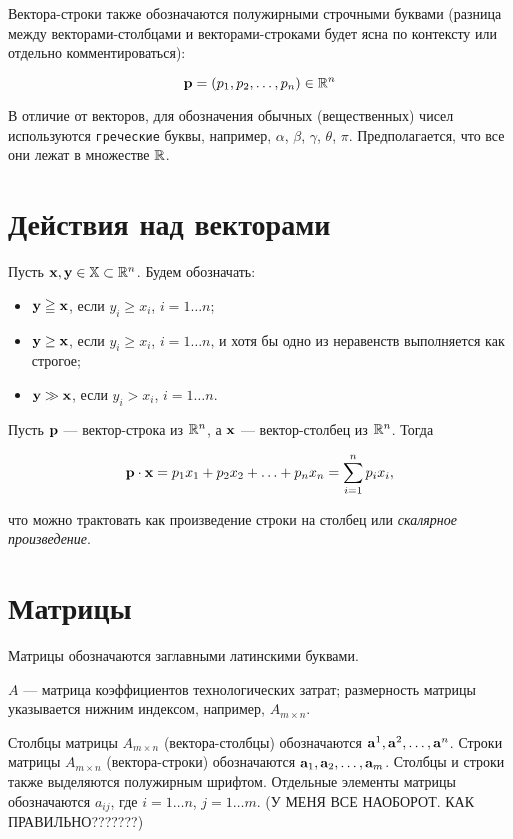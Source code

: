 \noindent Вектора-строки также обозначаются полужирными строчными
буквами (разница между векторами-столбцами и векторами-строками
будет ясна по контексту или отдельно комментироваться):

\[
\mathbf{p} = (p_1 ,p_2 , \ldots ,p_n ) \in \mathbb{R}^n
\]

В отличие от векторов, для обозначения обычных (вещественных) чисел
используются \texttt{греческие} буквы, например, $\alpha$, $\beta$,
$\gamma$, $\theta$, $\pi$. Предполагается, что все они лежат в
множестве $\mathbb{R}$.


\section*{Действия над векторами}

Пусть $\mathbf{x},\mathbf{y} \in \mathbb{X} \subset \mathbb{R}^n$. Будем обозначать:

\begin{itemize}
  \item $\mathbf{y} \geqq \mathbf{x}$, если $y_i \geq x_i$, $i=1 \ldots n$;
  \item $\mathbf{y} \geq \mathbf{x}$, если $y_i \geq x_i$, $i=1 \ldots n$, и хотя бы одно из
неравенств вы\-полняется как строгое;
  \item $\mathbf{y} \gg \mathbf{x}$, если $y_i > x_i$, $i=1 \ldots n$.
\end{itemize}

Пусть $\mathbf{p}$ --- вектор-строка из $\mathbb{R}^n$, а $\mathbf{x}$ ---
вектор-столбец из $\mathbb{R}^n$. Тогда

\[
\mathbf{p} \cdot \mathbf{x} = p_1 x_1 + p_2 x_2 + \ldots + p_n x_n = \sum
\limits_{i=1}^n p_i x_i,
\]

\noindent что можно трактовать как произведение строки на столбец
или \emph{скалярное произведение}.


\section*{Матрицы}

Матрицы обозначаются заглавными латинскими буквами.

$A$ --- матрица коэффициентов технологических затрат; размерность
матрицы указывается нижним индексом, например, $A_{m\times n}$.

Столбцы матрицы $A_{m\times n}$ (вектора-столбцы) обозначаются
$\mathbf{a}^1, \mathbf{a}^2, \ldots, \mathbf{a}^n$. Строки матрицы $A_{m\times
n}$ (вектора-строки) обозначаются $\mathbf{a}_1, \mathbf{a}_2, \ldots,
\mathbf{a}_m$. Столбцы и строки также выделяются полужирным шрифтом.
Отдельные элементы матрицы обозначаются $a_{ij}$, где $i=1 \ldots
n$, $j=1 \ldots m$. (У МЕНЯ ВСЕ НАОБОРОТ. КАК ПРАВИЛЬНО???????)

